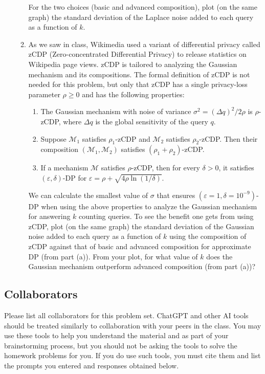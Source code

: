 \documentclass[11pt]{article}
\begin{document}
\begin{enumerate}[leftmargin=*]
\begin{enumerate}
            For the two choices (basic and advanced composition), plot (on the same graph) the standard deviation of the Laplace noise added to each query as a function of $k$.



            \item
            As we saw in class, Wikimedia used a variant of differential privacy called zCDP
            (Zero-concentrated Differential Privacy) to release statistics on Wikipedia page views. zCDP is tailored to analyzing the Gaussian mechanism and its compositions. The formal definition of zCDP is not needed for this problem, but only that zCDP has a single privacy-loss parameter $\rho\geq 0$ and has the following properties:
            \begin{enumerate}
                \item The Gaussian mechanism with noise of variance $\sigma^2 = (\Delta q)^2/2\rho$ is $\rho$-zCDP, where
                $\Delta q$ is the global sensitivity of the query
                $q$.
                \item Suppose $\mathcal{M}_1$ satisfies $\rho_1$-zCDP and $\mathcal{M}_2$ satisfies $\rho_2$-zCDP. Then their composition $(\mathcal{M}_1, \mathcal{M}_2)$ satisfies $(\rho_1+\rho_2)$-zCDP.
                \item If a mechanism $\mathcal{M}$ satisfies $\rho$-zCDP, then for every $\delta>0$, it satisfies $(\varepsilon,\delta)$-DP for  $\varepsilon=\rho+\sqrt{4\rho\ln(1/\delta)}.$
            \end{enumerate}
            We can calculate the smallest value of $\sigma$ that ensures $(\varepsilon=1,\delta=10^{-9})$-DP when using the above properties to analyze the Gaussian mechanism for answering $k$ counting queries. To see the benefit one gets from
            using zCDP, plot (on the same graph) the standard deviation of the Gaussian noise added to each query as a function of $k$ using the composition of zCDP against that of basic and advanced composition for approximate DP (from part (a)).
            From your plot, for what value of $k$ does the Gaussian mechanism outperform advanced composition (from part (a))?
        \end{enumerate}


\end{enumerate}

\subsection*{Collaborators}
Please list all collaborators for this problem set. ChatGPT and other AI tools should be treated similarly to collaboration with your peers in the 
class.  You may use these tools to help you understand the material and as part of your 
brainstorming process, but you should not be asking the tools to solve the homework problems 
for you. If you do use such tools, you must cite them and  list the 
prompts you entered and responses obtained below.
\end{document}
